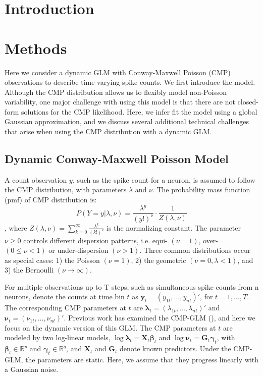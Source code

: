 \documentclass[aoas]{imsart}
\theoremstyle{plain}
\theoremstyle{remark}
\begin{document}
\section{Introduction}



\section{Methods}
Here we consider a dynamic GLM with Conway-Maxwell Poisson (CMP) observations to describe time-varying spike counts. We first introduce the model. Although the CMP distribution allows us to flexibly model non-Poisson variability, one major challenge with using this model is that there are not closed-form solutions for the CMP likelihood. Here, we infer fit the model using a global Gaussian approximation, and we discuss several additional technical challenges that arise when using the CMP distribution with a dynamic GLM.

\subsection{Dynamic Conway-Maxwell Poisson Model}
A count observation $y$, such as the spike count for a neuron, is assumed to follow the CMP distribution, with parameters $\lambda$ and $\nu$. The probability mass function (pmf) of CMP distribution is:
\begin{equation}
	P(Y=y|\lambda, \nu) = \frac{\lambda^y}{(y!)^\nu}\cdot\frac{1}{Z(\lambda, \nu)}
\end{equation}
, where $Z(\lambda, \nu)=\sum_{k=0}^{\infty}\frac{\lambda^k}{(k!)^\nu}$ is the normalizing constant. The parameter $\nu \geq 0$ controls different dispersion patterns, i.e. equi- $(\nu=1)$, over- $(0\leq\nu<1)$ or under-dispersion $(\nu > 1)$. Three common distributions occur as special cases: 1) the Poisson $(\nu=1)$, 2) the geometric $(\nu=0, \lambda<1)$, and 3) the Bernoulli $(\nu \rightarrow \infty)$.

For multiple observations up to T steps, such as simultaneous spike counts from n neurons, denote the counts at time bin $t$ as $\bm{y}_t = (y_{1t},\ldots,y_{nt})'$, for $t=1,\ldots, T$. The corresponding CMP parameters at $t$ are $\bm{\lambda}_t = (\lambda_{1t},\ldots,\lambda_{nt})'$ and $\bm{\nu}_t = (\nu_{1t},\ldots,\nu_{nt})'$. Previous work has examined the CMP-GLM (\cite{Chatla2018,Sellers2010}), and here we focus on the dynamic version of this GLM. The CMP parameters at $t$ are modeled by two log-linear models, $\log\bm{\lambda}_t = \bm{X}_t\bm{\beta}_t$ and $\log\bm{\nu}_t = \bm{G}_t\bm{\gamma}_t$, with $\bm{\beta}_t \in \mathbb{R}^p$ and $\bm{\gamma}_t \in \mathbb{R}^q$, and $\bm{X}_t$ and $\bm{G}_t$ denote known predictors. Under the CMP-GLM, the parameters are static. Here, we assume that they  progress linearly with a Gaussian noise.
\end{document}
